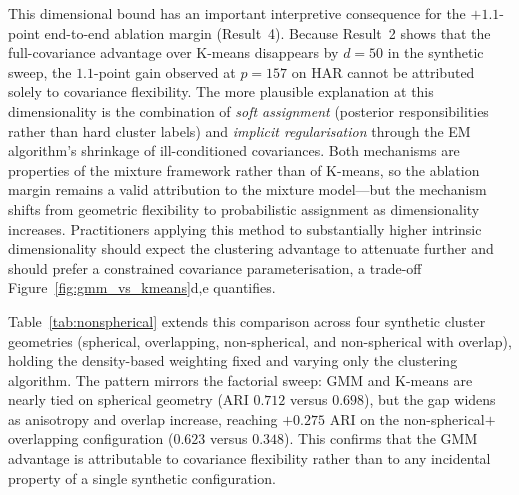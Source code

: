 \documentclass[lettersize,journal]{IEEEtran}
\begin{document}
		This dimensional bound has an important interpretive consequence for the $+1.1$-point end-to-end ablation margin (Result~4). Because Result~2 shows that the full-covariance advantage over K-means disappears by $d = 50$ in the synthetic sweep, the $1.1$-point gain observed at $p = 157$ on HAR cannot be attributed solely to covariance flexibility. The more plausible explanation at this dimensionality is the combination of \emph{soft assignment} (posterior responsibilities rather than hard cluster labels) and \emph{implicit regularisation} through the EM algorithm's shrinkage of ill-conditioned covariances. Both mechanisms are properties of the mixture framework rather than of K-means, so the ablation margin remains a valid attribution to the mixture model---but the mechanism shifts from geometric flexibility to probabilistic assignment as dimensionality increases. Practitioners applying this method to substantially higher intrinsic dimensionality should expect the clustering advantage to attenuate further and should prefer a constrained covariance parameterisation, a trade-off Figure~\ref{fig:gmm_vs_kmeans}d,e quantifies.

		

		Table~\ref{tab:nonspherical} extends this comparison across four synthetic cluster geometries (spherical, overlapping, non-spherical, and non-spherical with overlap), holding the density-based weighting fixed and varying only the clustering algorithm. The pattern mirrors the factorial sweep: GMM and K-means are nearly tied on spherical geometry (ARI $0.712$ versus $0.698$), but the gap widens as anisotropy and overlap increase, reaching $+0.275$ ARI on the non-spherical$+$overlapping configuration ($0.623$ versus $0.348$). This confirms that the GMM advantage is attributable to covariance flexibility rather than to any incidental property of a single synthetic configuration.

		
		
\end{document}
